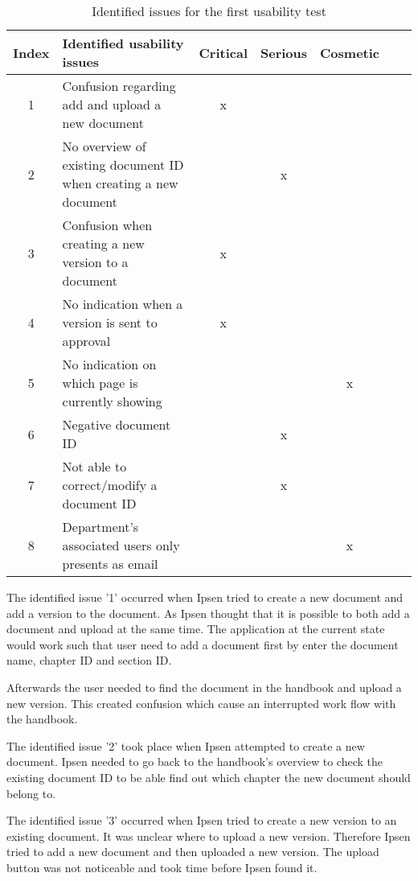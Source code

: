 \begin{table}[H]
	\begin{center}
	\begin{tabular}{| c | m{21em} | c | c | c | c | c |}
		\hline
		Index & \textbf{Identified usability issues} & Critical  & Serious & Cosmetic \\
		\hline
		 1 & Confusion regarding add and upload a new document   & x &  &  \\
		\hline
		 2 & No overview of existing document ID when creating a new document &  & x & \\
		\hline
		 3 & Confusion when creating a new version to a document & x & &  \\
		\hline
		4 & No indication when a version is sent to approval & x & & \\
		\hline
		5 & No indication on which page is currently showing &  &  & x \\
		\hline
		6 & Negative document ID &  & x & \\
		\hline
		7 & Not able to correct/modify a document ID & & x &  \\
		\hline
		8 & Department's associated users only presents as email &  &  & x \\
		\hline
	\end{tabular}
	\end{center}
	\caption{Identified issues for the first usability test}\label{tab:utest1}
\end{table}

The identified issue '1' occurred when Ipsen tried to create a new document and add a version to the document. 
As Ipsen thought that it is possible to both add a document and upload at the same time. 
The application at the current state would work such that user need to add a document first by enter the document name, chapter ID and section ID. 

Afterwards the user needed to find the document in the handbook and upload a new version. 
This created confusion which cause an interrupted work flow with the handbook.

The identified issue '2' took place when Ipsen attempted to create a new document. 
Ipsen needed to go back to the handbook's overview to check the existing document ID to be able find out which chapter the new document should belong to. 

The identified issue '3' occurred when Ipsen tried to create a new version to an existing document. 
It was unclear where to upload a new version. 
Therefore Ipsen tried to add a new document and then uploaded a new version. 
The upload button was not noticeable and took time before Ipsen found it. 

